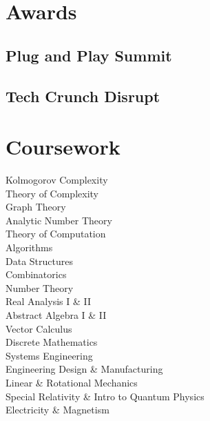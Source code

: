 \documentclass[]{jhearn-resume}
\begin{document}
\begin{minipage}[t]{0.34\textwidth} 

\vspace{25pt}

\vspace{-\topsep}

\section{Awards}
\subsection{Plug and Play Summit}
\sectionsep

\subsection{Tech Crunch Disrupt}
\sectionsep


\section{Coursework}
\small Kolmogorov Complexity\\
Theory of Complexity\\
Graph Theory\\
Analytic Number Theory\\
Theory of Computation \\
Algorithms \\
Data Structures \\
Combinatorics \\
Number Theory \\
Real Analysis I \& II \\
Abstract Algebra I \& II\\
Vector Calculus\\
Discrete Mathematics\\
Systems Engineering\\
Engineering Design \& Manufacturing\\
Linear \& Rotational Mechanics\\
Special Relativity \& Intro to Quantum Physics\\
Electricity \& Magnetism\\
\sectionsep
\vspace{-\topsep}

\end{minipage}
\end{document}

